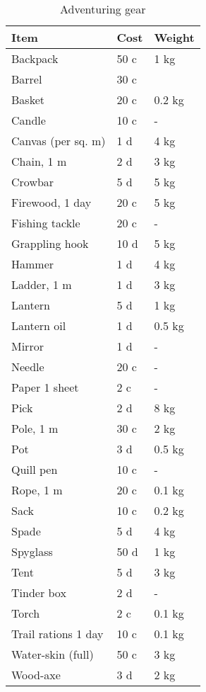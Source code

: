 \documentclass[a4paper,11pt,oneside]{book}
\begin{document}
\begin{table}[ht]
	\centering
	\caption{Adventuring gear}
	\begin{tabular}{|l|l|l|}
		\hline
		Item & Cost & Weight\\ [0.5ex]
		\hline
		Backpack & 50 c & 1 kg\\
		Barrel & 30 c & \\
		Basket & 20 c & 0.2 kg\\
		Candle & 10 c & -\\
		Canvas (per sq. m) & 1 d & 4 kg\\
		Chain, 1 m & 2 d & 3 kg\\
		Crowbar & 5 d & 5 kg\\
		Firewood, 1 day & 20 c & 5 kg\\
		Fishing tackle & 20 c & -\\
		Grappling hook & 10 d & 5 kg\\
		Hammer & 1 d & 4 kg\\
		Ladder, 1 m & 1 d & 3 kg\\
		Lantern & 5 d & 1 kg\\
		Lantern oil & 1 d & 0.5 kg \\
		Mirror & 1 d & -\\
		Needle & 20 c & -\\
		Paper 1 sheet & 2 c & -\\
		Pick & 2 d & 8 kg\\
		Pole, 1 m & 30 c & 2 kg\\
		Pot & 3 d & 0.5 kg\\
		Quill pen & 10 c & -\\
		Rope, 1 m & 20 c & 0.1 kg\\
		Sack & 10 c & 0.2 kg\\
		Spade & 5 d & 4 kg\\
		Spyglass & 50 d & 1 kg\\
		Tent & 5 d & 3 kg\\
		Tinder box & 2 d & -\\
		Torch & 2 c & 0.1 kg\\
		Trail rations 1 day & 10 c & 0.1 kg\\
		Water-skin (full) & 50 c & 3 kg\\	
		Wood-axe & 3 d & 2 kg\\	
		\hline
	\end{tabular}
\end{table}





\listoftables
\end{document}
